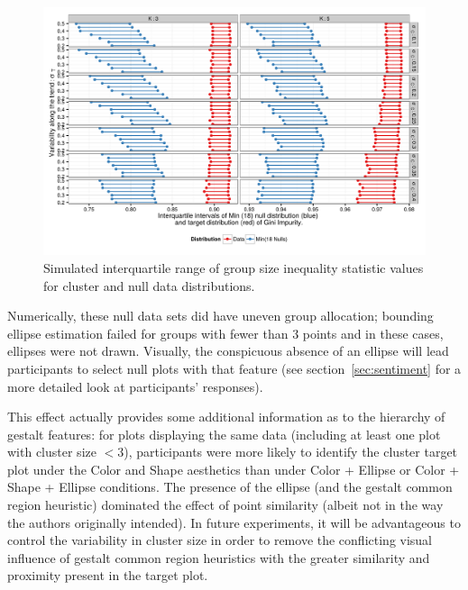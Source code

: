 \documentclass[11pt]{isuthesis}\usepackage[]{graphicx}\usepackage[]{color}
\newenvironment{knitrout}{}{} %
\begin{document}
\begin{figure}[ht]\centering
\begin{knitrout}
\color{fgcolor}

{\centering \includegraphics[width=.8\linewidth]{Figure/FeatureHierarchy/fig-simulationparameters-gini-1} 

}



\end{knitrout}
\caption[Simulated IQR of Gini impurity for cluster and null distributions]{Simulated interquartile range of group size inequality statistic values for cluster and null data distributions. \label{fig:simulationGiniIntervals}}
\end{figure}

Numerically, these null data sets did have uneven group allocation; bounding ellipse estimation failed for groups with fewer than 3 points and in these cases, ellipses were not drawn. Visually, the conspicuous absence of an ellipse will lead participants to select null plots with that feature (see section~\ref{sec:sentiment} for a more detailed look at participants' responses).

This effect actually provides some additional information as to the hierarchy of gestalt features: for plots displaying the same data (including at least one plot with cluster size $<3$), participants were more likely to identify the cluster target plot under the Color and Shape aesthetics than under Color + Ellipse or Color + Shape + Ellipse conditions. 
The presence of the ellipse (and the gestalt common region heuristic) dominated the effect of point similarity (albeit not in the way the authors originally intended). 
In future experiments, it will be advantageous to control the variability in cluster size in order to remove the conflicting visual influence of gestalt common region heuristics with the greater similarity and proximity present in the target plot. 
\end{document}
